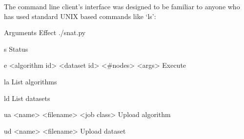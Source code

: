 The command line client's interface was designed to be familiar to anyone who has used standard UNIX based commands like ‘ls’:

                   Arguments                            Effect
./snat.py

     s                                                                  Status

     e    <algorithm id> <dataset id> <\#nodes> <args>        Execute

     la                                                                  List algorithms

     ld                                                                  List datasets

     ua   <name> <filename> <job class>                          Upload algorithm

     ud   <name> <filename>                                       Upload dataset


